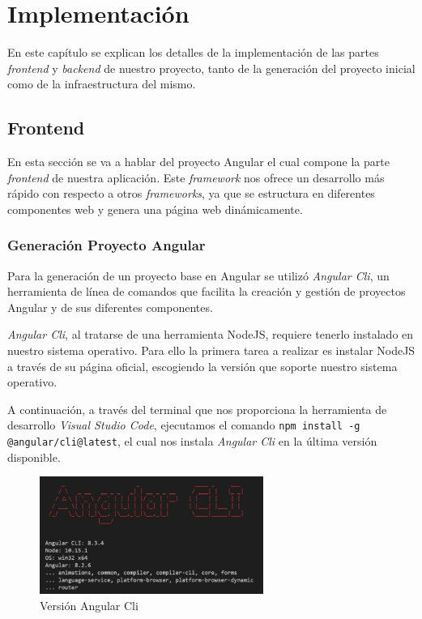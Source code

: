 \chapter{Implementación}
     En este capítulo se explican los detalles de la implementación de las partes \textit{frontend} y \textit{backend} de nuestro proyecto, tanto de la generación del proyecto inicial como de la infraestructura del mismo.
    
    
    \section{Frontend}
    En esta sección se va a hablar del proyecto Angular el cual compone la parte \textit{frontend} de nuestra aplicación. Este \textit{framework} nos ofrece un desarrollo más rápido con respecto a otros \textit{frameworks}, ya que se estructura en diferentes componentes web y genera una página web dinámicamente.
    \subsection{Generación Proyecto Angular}
    Para la generación de un proyecto base en Angular se utilizó \textit{Angular Cli}, un herramienta de línea de comandos que facilita la creación y gestión de proyectos Angular y de sus diferentes componentes.
    \newline
    
    \textit{Angular Cli}, al tratarse de  una herramienta NodeJS, requiere tenerlo instalado en nuestro sistema operativo. Para ello la primera tarea a realizar es instalar NodeJS a través de su página oficial\cite{nodejs}, escogiendo la versión que soporte nuestro sistema operativo.
 
    A continuación, a través del terminal que nos proporciona la herramienta de desarrollo \textit{Visual Studio Code}, ejecutamos el comando \texttt{npm install -g @angular/cli@latest}, el cual nos instala \textit{Angular Cli} en la última versión disponible.
    
    \begin{figure}[h]
    \centering
     \includegraphics[width=0.65\textwidth]{images/angularversion}
    \caption{Versión Angular Cli}
    \end{figure}
    
